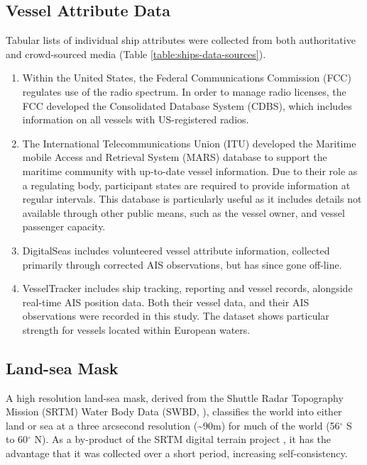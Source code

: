 \subsection{Vessel Attribute Data}
\label{sec:vessel-attribute-data}
Tabular lists of individual ship attributes were collected from both authoritative and crowd-sourced media (Table \ref{table:ships-data-sources}).
\begin{enumerate}
  \item Within the United States, the Federal Communications Commission (FCC) regulates use of the radio spectrum. In order to manage radio licenses, the FCC developed the Consolidated Database System (CDBS), which includes information on all vessels with US-registered radios. 
  \item The International Telecommunications Union (ITU) developed the Maritime mobile Access and Retrieval System (MARS) database to support the maritime community with up-to-date vessel information. Due to their role as a regulating body, participant states are required to provide information at regular intervals. This database is particularly useful as it includes details not available through other public means, such as the vessel owner, and vessel passenger capacity.
  \item DigitalSeas includes volunteered vessel attribute information, collected primarily through corrected AIS observations, but has since gone off-line.
  \item VesselTracker includes ship tracking, reporting and vessel records, alongside real-time AIS position data. Both their vessel data, and their AIS observations were recorded in this study. The dataset shows particular strength for vessels located within European waters. %
\end{enumerate}

\subsection{Land-sea Mask}
\label{sec:land-sea-mask}
  A high resolution land-sea mask, derived from the Shuttle Radar Topography Mission (SRTM) Water Body Data (SWBD, \citealp{slater2006srtm}), classifies the world into either land or sea at a three arcsecond resolution (\textasciitilde{}90m) for much of the world (56$^\circ$ S to 60$^\circ$ N). As a by-product of the SRTM digital terrain project \citep{rabus2003shuttle}, it has the advantage that it was collected over a short period, increasing self-consistency.

